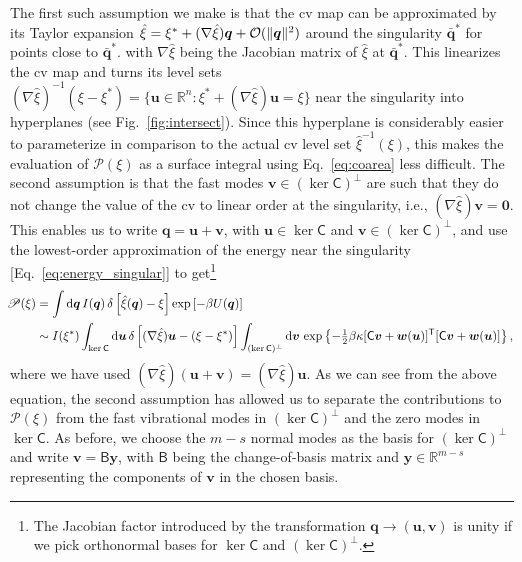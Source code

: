 The first such assumption we make is that the \ac{cv} map can be approximated by its Taylor expansion $\hat{\xi} = \xi^{*} + (\nabla\hat{\xi})\bm{q} + \mathcal{O}(\lVert\bm{q}\rVert^2)$ around the singularity $\bar{\bm{q}}^{*}$ for points close to $\bar{\bm{q}}^{*}$.
with $\nabla\hat{\xi}$ being the Jacobian matrix of $\hat{\xi}$ at $\bar{\bm{q}}^{*}$.
This linearizes the \ac{cv} map and turns its level sets $(\nabla\hat{\xi})^{-1}(\xi - \xi^{*}) = \{\bm{u} \in \mathbb{R}^{n}: \xi^{*} + (\nabla\hat{\xi})\bm{u} = \xi\}$ near the singularity into hyperplanes (see Fig.~\ref{fig:intersect}).
Since this hyperplane is considerably easier to parameterize in comparison to the actual \ac{cv} level set $\hat{\xi}^{-1}(\xi)$, this makes the evaluation of $\mathscr{P}(\xi)$ as a surface integral using Eq.~\eqref{eq:coarea} less difficult.
The second assumption is that the fast modes $\bm{v} \in (\ker\mathsf{C})^{\perp}$ are such that they do not change the value of the \ac{cv} to linear order at the singularity, i.e., $(\nabla\hat{\xi})\bm{v} = \bm{0}$.
This enables us to write $\bm{q} = \bm{u} + \bm{v}$, with $\bm{u} \in \ker\mathsf{C}$ and $\bm{v} \in (\ker\mathsf{C})^\perp$, and use the lowest-order approximation of the energy near the singularity [Eq.~\eqref{eq:energy_singular}] to get\footnote{The Jacobian factor introduced by the transformation $\bm{q} \to (\bm{u}, \bm{v})$ is unity if we pick orthonormal bases for $\ker\mathsf{C}$ and $(\ker\mathsf{C})^{\perp}$.}
%
\begin{equation}
  \hspace{-0.5em}
  \begin{aligned}
    \mathscr{P}(\xi) &= \int \mathrm{d}\bm{q}\, I(\bm{q})\,\delta\left[\hat{\xi}(\bm{q}) - \xi\right] \exp\left[-\beta U(\bm{q})\right]\\
                                 &\sim I(\xi^{*}) \int_{\ker\mathsf{C}} \mathrm{d}\bm{u}\, \delta\left[(\nabla\hat{\xi})\bm{u} - (\xi - \xi^{*})\right] \int_{(\ker\mathsf{C})^{\perp}} \mathrm{d}\bm{v}\,  \exp\left\{-\tfrac{1}{2}\beta\kappa[\mathsf{C}\bm{v} + \bm{w}(\bm{u})]^\mathsf{T}[\mathsf{C}\bm{v} + \bm{w}(\bm{u})]\right\},
  \end{aligned}
\end{equation}
%
where we have used $(\nabla\hat{\xi})(\bm{u} + \bm{v}) = (\nabla\hat{\xi})\bm{u}$.
As we can see from the above equation, the second assumption has allowed us to separate the contributions to $\mathscr{P}(\xi)$ from the fast vibrational modes in $(\ker\mathsf{C})^{\perp}$ and the zero modes in $\ker\mathsf{C}$.
As before, we choose the $m - s$ normal modes as the basis for $(\ker\mathsf{C})^{\perp}$ and write $\bm{v} = \mathsf{B}\bm{y}$, with $\mathsf{B}$ being the change-of-basis matrix and $\bm{y} \in \mathbb{R}^{m-s}$ representing the components of $\bm{v}$ in the chosen basis.
